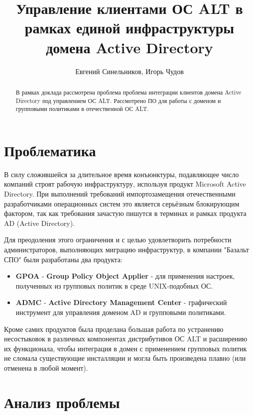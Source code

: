 \author{Евгений Синельников, Игорь Чудов}
\title{Управление клиентами ОС ALT в рамках единой инфраструктуры
домена Active Directory}
\maketitle

\begin{abstract}
  В рамках доклада рассмотрена проблема проблема интеграции клиентов
  домена Active Directory под управлением ОС ALT. Рассмотрено ПО для
  работы с доменом и групповыми политиками в отечественной ОС ALT.
\end{abstract}


\section{Проблематика}

В силу сложившейся за длительное время конъюнктуры, подавляющее число компаний
строят рабочую инфраструктуру, используя продукт Microsoft Active
Directory. При выполнений требований импортозамещения отечественными
разработчиками операционных систем это является серьёзным блокирующим
фактором, так как требования зачастую пишутся в терминах и рамках
продукта AD (Active Directory).

Для преодоления этого ограничения и с целью удовлетворить потребности
администраторов, выполняющих миграцию инфраструктур, в компании
"Базальт СПО" были разработаны два продукта:

\begin{itemize}
\item \textbf{GPOA} - \textbf{Group Policy Object Applier} - для применения
настроек, полученных из групповых политик в среде UNIX-подобных ОС.
\item \textbf{ADMC} - \textbf{Active Directory Management Center} -
графический инструмент для управления доменом AD и групповыми политиками.
\end{itemize}

Кроме самих продуктов была проделана большая работа по устранению
несостыковок в различных компонентах дистрибутивов ОС ALT и расширению
их функционала, чтобы интеграция в домен с применением групповых
политик не сломала существующие инсталляции и могла быть произведена
плавно (или отменена в любой момент).

\section{Анализ проблемы}


